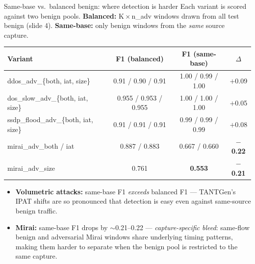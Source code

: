 \documentclass[10pt,aspectratio=169]{beamer}
\newcommand{\good}[1]{\textcolor{good}{\textbf{#1}}}
\newcommand{\warn}[1]{\textcolor{warn}{\textbf{#1}}}
\begin{document}
\begin{frame}{Same-base vs.\ balanced benign: where detection is harder}
Each variant is scored against two benign pools.
\textbf{Balanced:} K\,$\times$\,n\_adv windows drawn from all test benign (slide 4).
\textbf{Same-base:} only benign windows from the \emph{same} source capture.

\centering\small
\begin{tabular}{lcc>{\columncolor{warn!10}}c}
\toprule
\textbf{Variant} & \textbf{F1 (balanced)} & \textbf{F1 (same-base)} & \textbf{$\Delta$} \\
\midrule
\rowcolor{good!15} ddos\_adv\_\{both, iat, size\}        & 0.91 / 0.90 / 0.91 & 1.00 / 0.99 / 1.00 & $+$0.09 \\
\rowcolor{good!15} dos\_slow\_adv\_\{both, iat, size\}   & 0.955 / 0.953 / 0.955 & 1.00 / 1.00 / 1.00 & $+$0.05 \\
\rowcolor{good!15} ssdp\_flood\_adv\_\{both, iat, size\} & 0.91 / 0.91 / 0.91 & 0.99 / 0.99 / 0.99 & $+$0.08 \\
\rowcolor{warn!15} mirai\_adv\_both / iat                & 0.887 / 0.883 & 0.667 / 0.660 & \warn{$-$0.22} \\
\rowcolor{warn!15} mirai\_adv\_size                      & 0.761         & \warn{0.553}  & \warn{$-$0.21} \\
\bottomrule
\end{tabular}

\vspace{0.5em}
\begin{itemize}\small
  \item \good{Volumetric attacks:} same-base F1 \emph{exceeds} balanced F1 ---
        TANTGen's IPAT shifts are so pronounced that detection is easy even
        against same-source benign traffic.
  \item \warn{Mirai:} same-base F1 drops by $\sim$0.21--0.22 ---
        \emph{capture-specific bleed}: same-flow benign and adversarial Mirai
        windows share underlying timing patterns, making them harder to separate
        when the benign pool is restricted to the same capture.
\end{itemize}
\end{frame}
\end{document}

